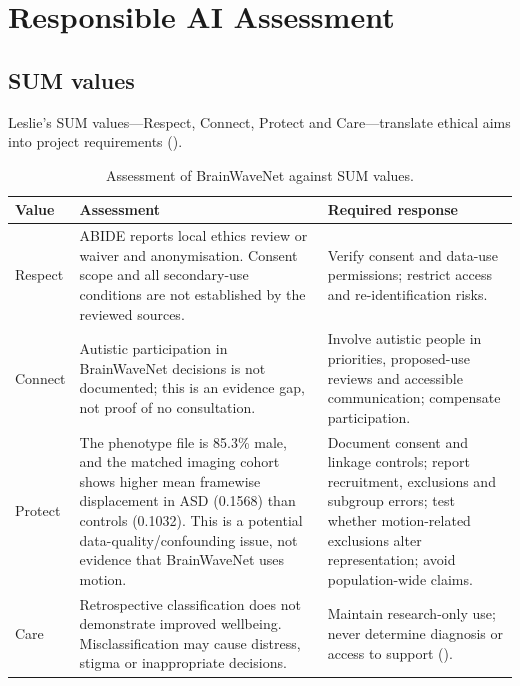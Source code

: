 \documentclass[11pt,a4paper]{article}
\begin{document}
\section{Responsible AI Assessment}

\subsection{SUM values}
Leslie's SUM values—Respect, Connect, Protect and Care—translate ethical aims into project requirements (\cite{leslie2019}).

\begin{table}[H]
\centering
\small
\begin{tabularx}{\textwidth}{p{1.8cm}Y Y}
\toprule
\textbf{Value} & \textbf{Assessment} & \textbf{Required response} \\
\midrule
Respect & ABIDE reports local ethics review or waiver and anonymisation. Consent scope and all secondary-use conditions are not established by the reviewed sources. & Verify consent and data-use permissions; restrict access and re-identification risks. \\
Connect & Autistic participation in BrainWaveNet decisions is not documented; this is an evidence gap, not proof of no consultation. & Involve autistic people in priorities, proposed-use reviews and accessible communication; compensate participation. \\
Protect & The phenotype file is 85.3\% male, and the matched imaging cohort shows higher mean framewise displacement in ASD (0.1568) than controls (0.1032). This is a potential data-quality/confounding issue, not evidence that BrainWaveNet uses motion. & Document consent and linkage controls; report recruitment, exclusions and subgroup errors; test whether motion-related exclusions alter representation; avoid population-wide claims. \\
Care & Retrospective classification does not demonstrate improved wellbeing. Misclassification may cause distress, stigma or inappropriate decisions. & Maintain research-only use; never determine diagnosis or access to support (\cite{topol2019,who2021}). \\
\bottomrule
\end{tabularx}
\caption{Assessment of BrainWaveNet against SUM values.}
\label{tab:sum}
\end{table}
\end{document}
